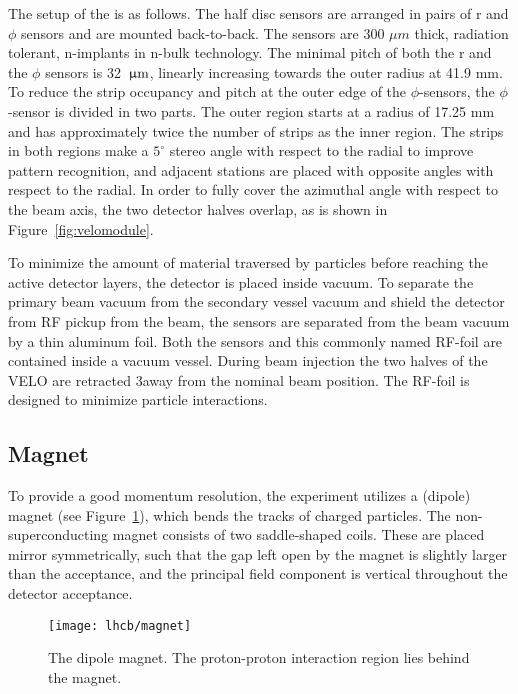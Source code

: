 



The setup of the \velo is as follows. The half disc sensors are arranged in
pairs of r and $\phi$ sensors and are mounted back-to-back. The sensors are 300
$\mu m$ thick, radiation tolerant, n-implants in n-bulk technology. The
minimal pitch of both the r and the $\phi$ sensors is 32 ${\,\upmu\rm m}$, linearly
increasing towards the outer radius at 41.9 mm. To reduce the strip occupancy
and pitch at the outer edge of the $\phi$-sensors, the $\phi$-sensor is divided
in two parts. The outer region starts at a radius of 17.25 mm and has
approximately twice the number of strips as the inner region. The strips in
both regions make a $5^\circ$ stereo angle with respect to the radial to
improve pattern recognition, and adjacent stations are placed with opposite
angles with respect to the radial. In order to fully cover the azimuthal angle
with respect to the beam axis, the two detector halves overlap, as is shown in
Figure~\ref{fig:velomodule}.

To minimize the amount of material traversed by particles 
before reaching the active detector layers, the detector is placed inside vacuum. 
To separate the primary beam vacuum from the secondary 
vessel vacuum and shield the detector
from RF pickup from the beam, the sensors are separated from the beam vacuum by
a thin aluminum foil. Both the sensors and this commonly named RF-foil are
contained inside a vacuum vessel. During beam injection the two halves of the
VELO are retracted 3\cm away from the nominal beam position. The RF-foil is
designed to minimize particle interactions.

\subsection{Magnet}

To provide a good momentum resolution, the \lhcb experiment utilizes a (dipole)
magnet (see Figure~\ref{fig:magnet}), which bends the tracks of charged
particles. The non-superconducting magnet consists of two saddle-shaped coils.
These are placed mirror symmetrically, such that the gap left open by the
magnet is slightly larger than the \lhcb acceptance, and the principal field
component is vertical throughout the detector acceptance.

\begin{figure}[tb]
\begin{center}
\texttt{[image: lhcb/magnet]}
\end{center}
\caption{\small The \lhcb dipole magnet. The proton-proton interaction
region lies behind the magnet.}
\label{fig:magnet}
\end{figure}


